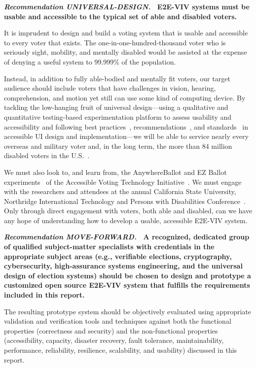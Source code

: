 \vspace{12pt} 
\textbf{\emph{Recommendation UNIVERSAL-DESIGN.} \ E2E-VIV
  systems must be usable and accessible to the typical set of able and
  disabled voters.}

It is imprudent to design and build a voting system that is usable and
accessible to every voter that exists. The one-in-one-hundred-thousand
voter who is seriously sight, mobility, and mentally disabled would be
assisted at the expense of denying a useful system to 99.999\% of the
population.

Instead, in addition to fully able-bodied and mentally fit voters, our
target audience should include voters that have challenges in vision,
hearing, comprehension, and motion yet still can use some kind of
computing device. By tackling the low-hanging fruit of universal
design---using a qualitative and quantitative testing-based
experimentation platform to assess usability and accessibility and
following best practices~\cite{materials-at-elections.itif.org},
recommendations~\cite{WAI,Section508,WAVE}, and
standards~\cite{standards} in accessible UI design and
implementation---we will be able to service nearly every overseas and
military voter and, in the long term, the more than 84 million
disabled voters in the U.S.~\cite{Brennen,CensusData}.

We must also look to, and learn from, the AnywhereBallot and EZ Ballot
experiments~\cite{AnywhereBallot,EZBallot} of the Accessible Voting
Technology Initiative~\cite{AVTI}.  We must engage with the
researchers and attendees at the annual California State University,
Northridge International Technology and Persons with Disabilities
Conference~\cite{CSUN}. Only through direct engagement with voters,
both able and disabled, can we have any hope of understanding how to
develop a usable, accessible E2E-VIV system.

\vspace{12pt} 

\textbf{\emph{Recommendation MOVE-FORWARD.} \ A recognized, dedicated
  group of qualified subject-matter specialists with credentials in
  the appropriate subject areas (e.g., verifiable elections,
  cryptography, cybersecurity, high-assurance systems engineering, and
  the universal design of election systems) should be chosen to design
  and prototype a customized open source E2E-VIV system that fulfills
  the requirements included in this report.}

The resulting prototype system should be objectively evaluated using
appropriate validation and verification tools and techniques against
both the functional properties (correctness and security) and the 
non-functional properties (accessibility, capacity, disaster recovery,
fault tolerance, maintainability, performance, reliability,
resilience, scalability, and usability) discussed in this report.

